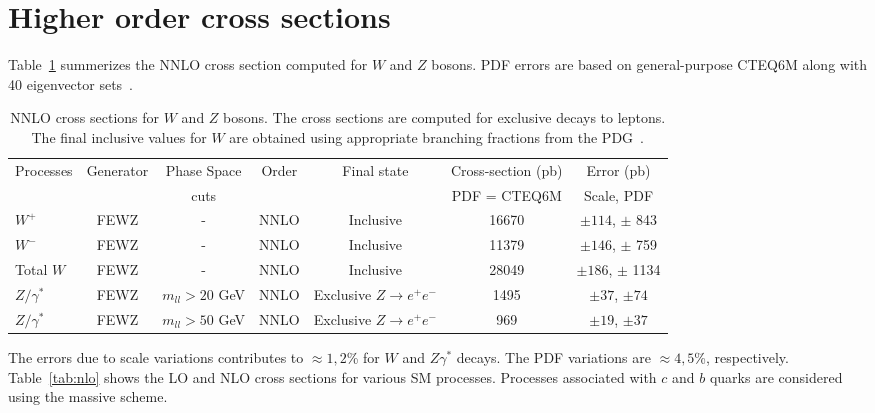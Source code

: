 \section{Higher order cross sections}
\label{sec:results}

Table~\ref{tab:nnlo} summerizes the NNLO cross section computed for $W$ and $Z$ bosons. 
PDF errors are based on general-purpose CTEQ6M along with 40 eigenvector sets~\cite{cteq6m}.

\vspace{3mm}
\begin{table}[hbt]
\begin{center}
\renewcommand{\arraystretch}{1.2}
\begin{tabular}{|l|c|c|c|c|c|c|}\hline
Processes & Generator & Phase Space& Order & Final state & Cross-section (pb)& Error (pb) \\ 
 &  &  cuts & & & PDF = CTEQ6M & Scale, PDF \\ \hline
$W^+$ & FEWZ & - & NNLO & Inclusive & 16670 & $\pm 114$, $\pm$ 843 \\ \hline
$W^-$ & FEWZ & - & NNLO & Inclusive & 11379 & $\pm 146$, $\pm$ 759 \\ \hline
Total $W$ & FEWZ & - & NNLO & Inclusive & 28049 & $\pm 186$, $\pm$ 1134 \\ \hline
$Z/\gamma^*$ & FEWZ & $m_{ll} > 20$ GeV & NNLO & Exclusive $Z \rightarrow e^+e^-$ & 1495 & $\pm 37$, $\pm 74$ \\ \hline
$Z/\gamma^*$ & FEWZ & $m_{ll} > 50$ GeV & NNLO & Exclusive $Z \rightarrow e^+e^-$ & 969 & $\pm 19$, $\pm 37$ \\ \hline
\end{tabular} 
\caption{NNLO cross sections for $W$ and $Z$ bosons. The cross sections are computed for
exclusive decays to leptons. The final inclusive values for $W$ are obtained using appropriate 
branching fractions from the PDG~\cite{pdg}. \label{tab:nnlo}}
\end{center}
\end{table}

The errors due to scale variations contributes to $\approx 1, 2$\% for $W$ 
and $Z\gamma^*$ decays. The PDF variations are $\approx 4, 5$\%, respectively.
Table~\ref{tab:nlo} shows the LO and NLO cross sections for various SM processes.
Processes associated with $c$ and $b$ quarks are considered using the massive scheme.

